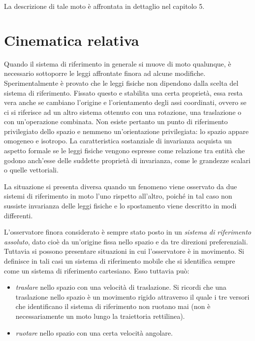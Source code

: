 La descrizione di tale moto è affrontata in dettaglio nel capitolo 5.

\section{Cinematica relativa}

Quando il sistema di riferimento in generale si muove di moto qualunque, è necessario sottoporre le leggi affrontate finora ad alcune modifiche. Sperimentalmente è provato che le leggi fisiche non dipendono dalla scelta del sistema di riferimento. Fissato questo e stabilita una certa proprietà, essa resta vera anche se cambiano l'origine e l'orientamento degli assi coordinati, ovvero se ci si riferisce ad un altro sistema ottenuto con una rotazione, una traslazione o con un'operazione combinata. Non esiste pertanto un punto di riferimento privilegiato dello spazio e nemmeno un'orientazione privilegiata: lo spazio appare omogeneo e isotropo. La caratteristica sostanziale di invarianza acquista un aspetto formale se le leggi fisiche vengono espresse come relazione tra entità che godono anch'esse delle suddette proprietà di invarianza, come le grandezze scalari o quelle vettoriali.

La situazione si presenta diversa quando un fenomeno viene osservato da due sistemi di riferimento in moto l'uno rispetto all'altro, poiché in tal caso non sussiste invarianza delle leggi fisiche e lo spostamento viene descritto in modi differenti.

L'osservatore finora considerato è sempre stato posto in un \emph{sistema di riferimento assoluto}, dato cioè da un'origine fissa nello spazio e da tre direzioni preferenziali. Tuttavia si possono presentare situazioni in cui l'osservatore è in movimento. Si definisce in tali casi un sistema di riferimento mobile che si identifica sempre come un sistema di riferimento cartesiano. Esso tuttavia può:

\begin{itemize}
	\item \emph{traslare} nello spazio con una velocità di traslazione. Si ricordi che una traslazione nello spazio è un movimento rigido attraverso il quale i tre versori che identificano il sistema di riferimento non ruotano mai (non è necessariamente un moto lungo la traiettoria rettilinea).
	\item \emph{ruotare} nello spazio con una certa velocità angolare.
\end{itemize}

